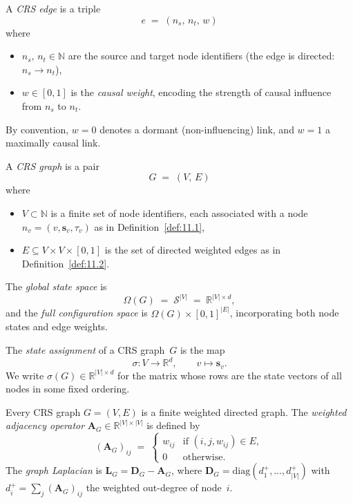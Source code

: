\begin{definition}
\label{def:11.2}
A \emph{CRS edge} is a triple
\[
  e \;=\; (n_s,\, n_t,\, w)
\]
where
\begin{itemize}
  \item $n_s,\, n_t \in \mathbb{N}$ are the source and target node
        identifiers (the edge is directed: $n_s \to n_t$),
  \item $w \in [0,1]$ is the \emph{causal weight}, encoding the
        strength of causal influence from $n_s$ to $n_t$.
\end{itemize}
By convention, $w = 0$ denotes a dormant (non-influencing) link, and
$w = 1$ a maximally causal link.
\end{definition}

\begin{definition}
\label{def:11.3}
A \emph{CRS graph} is a pair
\[
  G \;=\; (V,\, E)
\]
where
\begin{itemize}
  \item $V \subset \mathbb{N}$ is a finite set of node identifiers,
        each associated with a node $n_v = (v, \mathbf{s}_v, \tau_v)$
        as in Definition~\ref{def:11.1},
  \item $E \subseteq V \times V \times [0,1]$ is the set of directed
        weighted edges as in Definition~\ref{def:11.2}.
\end{itemize}
The \emph{global state space} is
\begin{equation}
\label{eq:11.global_state}
  \Omega(G) \;=\; \mathcal{S}^{|V|} \;=\; \mathbb{R}^{|V| \times d},
\end{equation}
and the \emph{full configuration space} is
$\Omega(G) \times [0,1]^{|E|}$, incorporating both node states and
edge weights.
\end{definition}

\begin{definition}
\label{def:11.4}
The \emph{state assignment} of a CRS graph~$G$ is the map
\[
  \sigma \colon V \to \mathbb{R}^d, \qquad v \mapsto \mathbf{s}_v.
\]
We write $\sigma(G) \in \mathbb{R}^{|V| \times d}$ for the matrix
whose rows are the state vectors of all nodes in some fixed ordering.
\end{definition}

\begin{lemma}
\label{lem:11.1}
Every CRS graph $G = (V, E)$ is a finite weighted directed graph.
The \emph{weighted adjacency operator} $\mathbf{A}_G \in
\mathbb{R}^{|V| \times |V|}$ is defined by
\begin{equation}
\label{eq:11.adjacency}
  (\mathbf{A}_G)_{ij} \;=\;
  \begin{cases}
    w_{ij} & \text{if } (i,j,w_{ij}) \in E, \\
    0      & \text{otherwise}.
  \end{cases}
\end{equation}
The \emph{graph Laplacian} is $\mathbf{L}_G = \mathbf{D}_G -
\mathbf{A}_G$, where $\mathbf{D}_G = \mathrm{diag}(d_1^+,\ldots,
d_{|V|}^+)$ with $d_i^+ = \sum_j (\mathbf{A}_G)_{ij}$ the
weighted out-degree of node~$i$.
\end{lemma}

